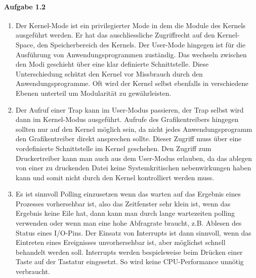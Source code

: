 \documentclass[11pt]{article}
\begin{document}

\paragraph{Aufgabe 1.2}
\begin{enumerate}[label=\alph*)]
\item Der Kernel-Mode ist ein privilegierter Mode in dem die Module des Kernels ausgeführt werden. Er hat das auschliessliche Zugriffrecht auf den Kernel-Space, den Speicherbereich des Kernels. Der User-Mode hingegen ist für die Ausführung von Anwendungsprogrammen zuständig. Das wechseln zwischen den Modi geschieht über eine klar definierte Schnittstelle. Diese Unterschiedung schützt den Kernel vor Missbrauch durch den Anwendungsprogramme. Oft wird der Kernel selbst ebenfalls in verschiedene Ebenen unterteil um Modularität zu gewährleisten.

\item Der Aufruf einer Trap kann im User-Modus passieren, der Trap selbst wird dann im Kernel-Modus ausgeführt. Aufrufe des Grafikentreibers hingegen sollten nur auf den Kernel möglich sein, da nicht jedes Anwendungsprogramm den Grafikentreiber direkt ansprechen sollte. Dieser Zugriff muss über eine vordefinierte Schnittstelle im Kernel geschehen. Den Zugriff zum Druckertreiber kann man auch aus dem User-Modus erlauben, da das ablegen von einer zu druckenden Datei keine Systemkritischen nebenwirkungen haben kann und somit nicht durch den Kernel kontrolliert werden muss.

\item Es ist sinnvoll Polling einzusetzen wenn das warten auf das Ergebnis eines Prozesses vorhersehbar ist, also das Zeitfenster sehr klein ist, wenn das Ergebnis keine Eile hat, dann kann man durch lange wartezeiten polling verwenden oder wenn man eine hohe Abfragrate braucht, z.B. Ablesen des Status eines I/O-Pins. Der Einsatz von Interrupts ist dann sinnvoll, wenn das Eintreten eines Ereignisses unvorhersehbar ist, aber möglichst schnell behandelt werden soll. Interrupts werden bespielsweise beim Drücken einer Taste auf der Tastatur eingesetzt. So wird keine CPU-Performance unnötig verbraucht.

\end{enumerate} 
\end{document}
